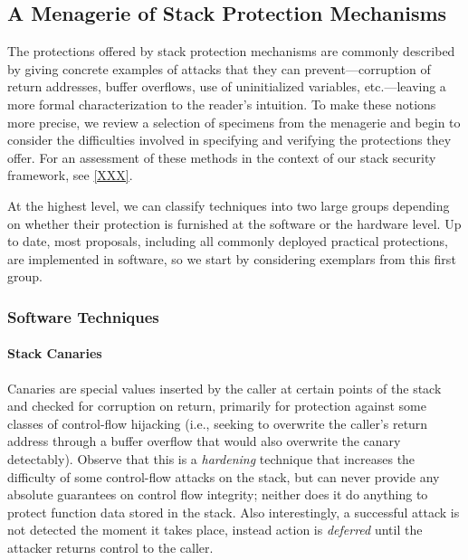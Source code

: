 \subsection{A Menagerie of Stack Protection Mechanisms}


The protections offered by stack protection mechanisms are commonly described by giving
concrete examples of attacks that they can prevent---corruption of return
addresses, buffer overflows, use of uninitialized variables, etc.---leaving
a more formal characterization to the reader's intuition.
%
To make these notions more precise, we review a selection of specimens from the
menagerie and begin to consider the difficulties involved in specifying and
verifying the protections they offer.
%
For an assessment of these methods in the context of our stack security
framework, see \cref{XXX}.

At the highest level, we can classify techniques into two large groups depending
on whether their protection is furnished at the software or the hardware level.
Up to date, most proposals, including all commonly deployed practical
protections, are implemented in software, so we start by considering exemplars
from this first group.

\subsubsection{Software Techniques}

\paragraph{Stack Canaries}
%
Canaries are special values inserted by the caller at certain points of the
stack and checked for corruption on return, primarily for protection against
some classes of control-flow hijacking (i.e., seeking to overwrite the caller's
return address through a buffer overflow that would also overwrite the canary
detectably).
%
Observe that this is a \emph{hardening} technique that increases the difficulty
of some control-flow attacks on the stack, but can never provide any absolute
guarantees on control flow integrity; neither does it do anything to protect
function data stored in the stack.
%
Also interestingly, a successful attack is not detected the moment it takes
place, instead action is \emph{deferred} until the attacker returns control to
the caller.

